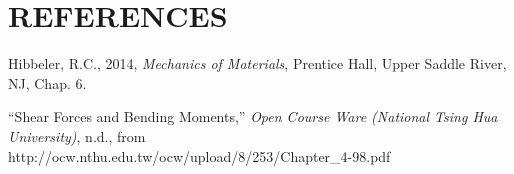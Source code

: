 \documentclass[12pt]{article}
\begin{document}
\section*{\fontsize{12}{12}\selectfont REFERENCES}

\begin{thebibliography}{2}

\bibitem{}
Hibbeler, R.C., 2014, \emph{Mechanics of Materials}, Prentice Hall, Upper Saddle River, NJ, Chap. 6.

\bibitem{}
“Shear Forces and Bending Moments,” \emph{Open Course Ware (National Tsing Hua University)}, n.d., from
\\http://ocw.nthu.edu.tw/ocw/upload/8/253/Chapter\_4-98.pdf


\end{thebibliography}


\end{document}

